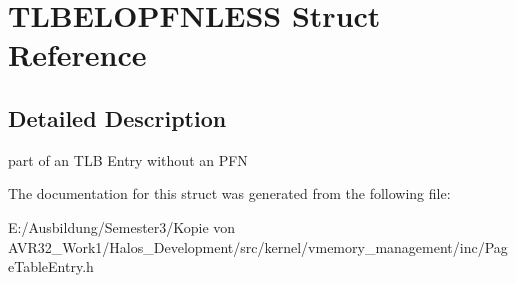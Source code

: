 \hypertarget{struct_t_l_b_e_l_o_p_f_n_l_e_s_s}{
\section{TLBELOPFNLESS Struct Reference}
\label{struct_t_l_b_e_l_o_p_f_n_l_e_s_s}
}


\subsection{Detailed Description}
part of an TLB Entry without an PFN 

The documentation for this struct was generated from the following file:\begin{CompactItemize}
\item 
E:/Ausbildung/Semester3/Kopie von AVR32\_\-Work1/Halos\_\-Development/src/kernel/vmemory\_\-management/inc/PageTableEntry.h\end{CompactItemize}
